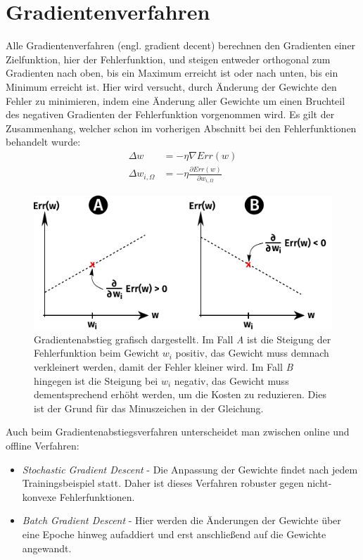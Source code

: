 \section*{Gradientenverfahren}
Alle Gradientenverfahren (engl. gradient decent) berechnen den Gradienten einer Zielfunktion, hier der Fehlerfunktion, und steigen entweder orthogonal zum Gradienten nach oben, bis ein Maximum erreicht ist oder nach unten, bis ein Minimum erreicht ist.
Hier wird versucht, durch Änderung der Gewichte den Fehler zu minimieren, indem eine Änderung aller Gewichte um einen Bruchteil des negativen Gradienten der Fehlerfunktion vorgenommen wird.
Es gilt der Zusammenhang, welcher schon im vorherigen Abschnitt bei den Fehlerfunktionen behandelt wurde:
\begin{align*}
	\Delta w &= - \eta \nabla Err(w) \\
	\Delta w_{i,\Omega} &= - \eta \frac{\partial Err(w)}{\partial w_{i,\Omega}}
\end{align*}

\begin{figure}[ht!] \centering 
	\includegraphics[width=\linewidth]{figures/ch03_gradient-decent.pdf}
	\caption{Gradientenabstieg grafisch dargestellt. Im Fall \emph{A} ist die Steigung der Fehlerfunktion beim Gewicht $w_i$ positiv, das Gewicht muss demnach verkleinert werden, damit der Fehler kleiner wird. Im Fall \emph{B} hingegen ist die Steigung bei $w_i$ negativ, das Gewicht muss dementsprechend erhöht werden, um die Kosten zu reduzieren. Dies ist der Grund für das Minuszeichen in der Gleichung.}
	\label{fig:ch03_fehlerflaeche}
\end{figure}

Auch beim Gradientenabstiegsverfahren unterscheidet man zwischen online und offline Verfahren: 
\begin{itemize}
	\item \emph{Stochastic Gradient Descent} - Die Anpassung der Gewichte findet nach jedem Trainingsbeispiel statt. Daher ist dieses Verfahren robuster gegen nicht-konvexe Fehlerfunktionen. 
	\item \emph{Batch Gradient Descent} - Hier werden die Änderungen der Gewichte über eine Epoche hinweg aufaddiert und erst anschließend auf die Gewichte angewandt.
\end{itemize}


